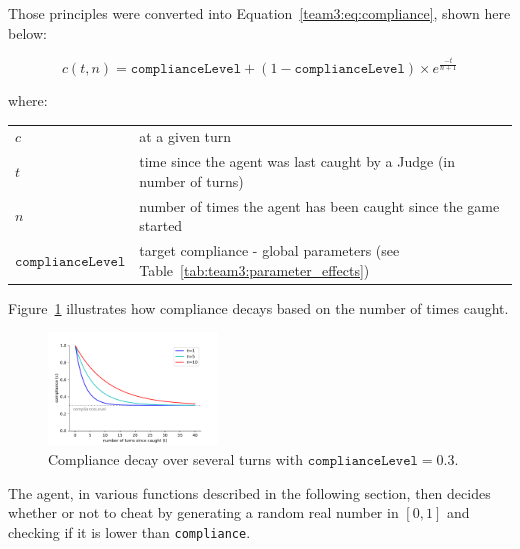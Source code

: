 \documentclass{article}
\makeatletter
\newenvironment{conditions}
  {\par\vspace{\abovedisplayskip}\noindent\begin{tabular}{>{$}l<{$} @{${}={}$} l}}
  {\end{tabular}\par\vspace{\belowdisplayskip}}
\makeatother
\begin{document}
Those principles were converted into Equation~\ref{team3:eq:compliance}, shown here below:

\begin{equation}
    c(t,n)=\texttt{complianceLevel}+(1-\texttt{complianceLevel})\times e^{\frac{-t}{n+1}} \label{team3:eq:compliance}
\end{equation}

where:
\begin{conditions}
 c     &  \textttt{compliance} at a given turn \\
 t     &  time since the agent was last caught by a Judge (in number of turns) \\
 n    &  number of times the agent has been caught since the game started \\   
 \texttt{complianceLevel} &  target compliance - global parameters (see Table~\ref{tab:team3:parameter_effects})
\end{conditions}

Figure~\ref{fig:compliance_decay} illustrates how compliance decays based on the number of times caught. 

\begin{figure}[H] 
\centering
\includegraphics[width=0.4\textwidth]{figures/compliance_graph.pdf}
\caption{Compliance decay over several turns with $\texttt{complianceLevel}=0.3$.}
\label{fig:compliance_decay}
\end{figure} 

The agent, in various functions described in the following section, then decides whether or not to cheat by generating a random real number in $[0,1]$ and checking if it is lower than \texttt{compliance}.


\end{document}
